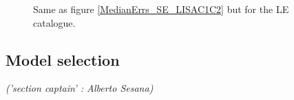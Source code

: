 \documentclass{iopart}
\begin{document}
\begin{figure}
\caption{Same as figure \ref{MedianErrs_SE_LISAC1C2} but for the LE catalogue.
\label{MedianErrs_LE_LISAC1C2} } 
\end{figure}















\subsection{Model selection}
\label{SS:MBHbModel}
{\it ('section captain' : Alberto Sesana) }
























\end{document}
